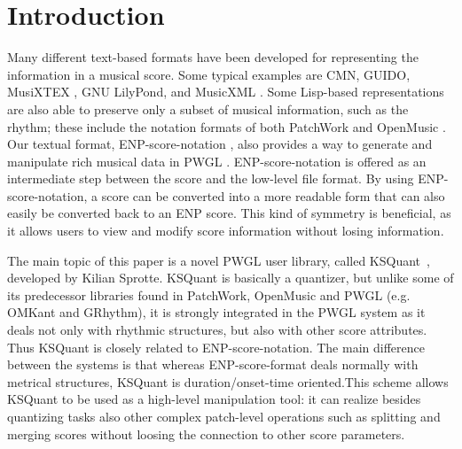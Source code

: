 \documentclass[runningheads,a4paper]{llncs}
\begin{document}
\section{Introduction}\label{sec:introduction}
Many different text-based formats have been developed for representing
the information in a musical score. Some typical examples are CMN,
GUIDO, MusiXTEX \cite{agon}, GNU LilyPond\cite{agon}, and
MusicXML \cite{agon}. Some Lisp-based representations are also
able to preserve only a subset of musical information, such as the
rhythm; these include the notation formats of both PatchWork \cite{agon}
and OpenMusic \cite{agon}. Our textual format, ENP-score-notation
\cite{agon}, also provides a way to generate and manipulate rich
musical data in PWGL \cite{agon}.  ENP-score-notation is offered as an
intermediate step between the score and the low-level file format. By
using ENP-score-notation, a score can be converted into a more
readable form that can also easily be converted back to an ENP
score. This kind of symmetry is beneficial, as it allows users to view
and modify score information without losing information.

The main topic of this paper is a novel PWGL user library, called
KSQuant~\cite{agon}, developed by Kilian Sprotte. KSQuant is
basically a quantizer, but unlike some of its predecessor libraries
found in PatchWork, OpenMusic and PWGL (e.g. OMKant and GRhythm), it
is strongly integrated in the PWGL system as it deals not only with
rhythmic structures, but also with other score attributes. Thus
KSQuant is closely related to ENP-score-notation. The main difference
between the systems is that whereas ENP-score-format deals normally
with metrical structures, KSQuant is duration/onset-time oriented.This
scheme allows KSQuant to be used as a high-level manipulation tool: it
can realize besides quantizing tasks also other complex patch-level
operations such as splitting and merging scores without loosing the
connection to other score parameters.
\end{document}

